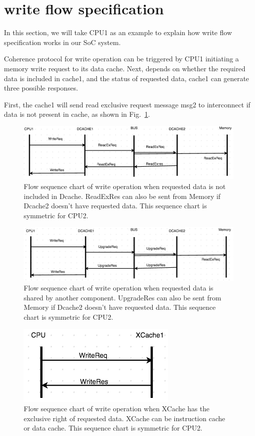\documentclass[conference]{IEEEtran}
\begin{document}
\section{write flow specification}

In this section, we will take CPU1 as an example to explain how write flow specification works in our SoC system.
 
Coherence protocol for write operation can be triggered by CPU1 initiating a memory write request to its data cache. Next, depends on whether the required data is included in cache1, and the status of requested data,  cache1 can generate three possible responses. 

First, the cache1 will send read exclusive request message msg2 to interconnect if data is not present in cache, as shown in Fig.~\ref{write3}.

 \begin{figure} 
 \centerline{
 \includegraphics[width=4In]{figures/write3.png}}
 \caption{Flow sequence chart of write operation when requested data is not included in Dcache. ReadExRes can also be sent from Memory if Dcache2 doesn't have requested data. This sequence chart is symmetric for CPU2. }
 \label{write3}
 \end{figure}
 
 \begin{figure} 
 \centerline{
 \includegraphics[width=4In]{figures/write2.png}}
 \caption{Flow sequence chart of write operation when requested data is shared by another component. UpgradeRes can also be sent from Memory if Dcache2 doesn't have requested data. This sequence chart is symmetric for CPU2. }
 \label{write2}
 \end{figure}

 \begin{figure} 
 \includegraphics[width=1.9In]{figures/write1.png}
 \caption{Flow sequence chart of write operation when XCache has the exclusive right of requested data. XCache can be instruction cache or data cache. This sequence chart is symmetric for CPU2. }
 \label{write1}
 \end{figure}
 
\end{document}
